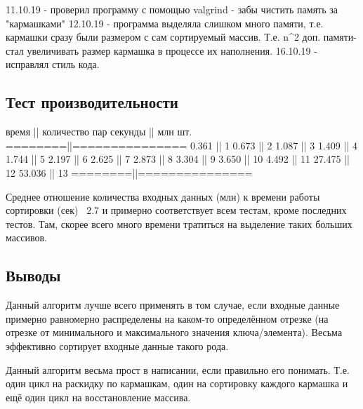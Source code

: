 \documentclass[12pt]{article}
\begin{document}
11.10.19 - проверил программу с помощью valgrind - забы чистить память за "кармашками"
12.10.19 - программа выделяла слишком много памяти, т.е. кармашки сразу были размером 
с сам сортируемый массив. Т.е. n^2 доп. памяти- стал увеличивать размер кармашка в процессе их наполнения.
16.10.19 - исправлял стиль кода.

\subsection*{Тест производительности}

 время   || количество пар 
 секунды || млн шт.
 ========||===============
  0.361  ||   1
  0.673  ||   2
  1.087  ||   3
  1.409  ||   4
  1.744  ||   5
  2.197  ||   6
  2.625  ||   7 
  2.873  ||   8
  3.304  ||   9
  3.650  ||   10
  4.492  ||   11
 27.475  ||   12
 53.036	 ||   13
 ========||===============

Среднее отношение количества входных данных (млн) к времени работы сортировки (сек) ~2.7 
и примерно соответствует всем тестам, кроме последних тестов. Там, скорее всего много времени
тратиться на выделение таких больших массивов.

\subsection*{Выводы}

Данный алгоритм лучше всего применять в том случае, если входные данные примерно
равномерно распределены на каком-то определённом отрезке (на отрезке от минимального 
и максимального значения ключа/элемента). Весьма эффективно сортирует входные данные 
такого рода.

Данный алгоритм весьма прост в написании, если правильно его понимать. 
Т.е. один цикл на раскидку по кармашкам, один на сортировку каждого кармашка и 
ещё один цикл на восстановление массива.
\end{document}

